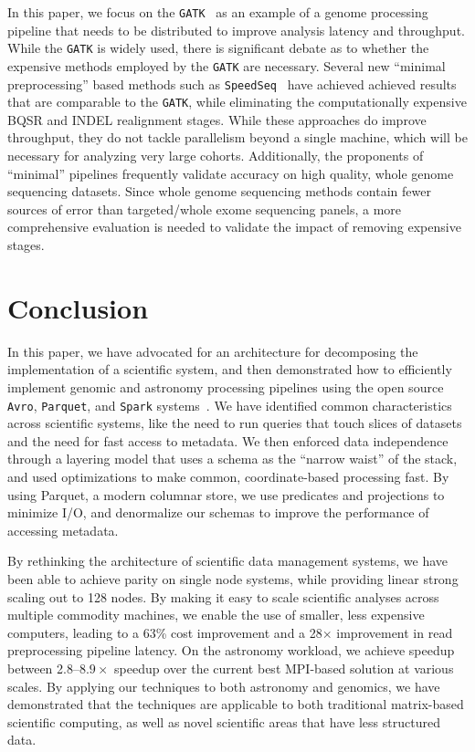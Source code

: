 \documentclass{sig-alternate}
\begin{document}
In this paper, we focus on the \texttt{GATK}~\cite{depristo11} as an example of a genome processing pipeline that
needs to be distributed to improve analysis latency and throughput. While the \texttt{GATK} is widely used,
there is significant debate as to whether the expensive methods employed by the \texttt{GATK} are necessary. Several
new ``minimal preprocessing'' based methods such as \texttt{SpeedSeq}~\cite{chiang14} have achieved achieved
results that are comparable to the \texttt{GATK}, while eliminating the computationally expensive BQSR and INDEL
realignment stages. While these approaches do improve throughput, they do not tackle parallelism beyond a single
machine, which will be necessary for analyzing very large cohorts. Additionally, the proponents of ``minimal'' pipelines
frequently validate accuracy on high quality, whole genome sequencing datasets. Since whole genome sequencing
methods contain fewer sources of error than targeted/whole exome sequencing panels, a more comprehensive
evaluation is needed to validate the impact of removing expensive stages.

\section{Conclusion}
\label{sec:conclusion}

In this paper, we have advocated for an architecture for decomposing the implementation of a scientific system, and
then demonstrated how to efficiently implement genomic and astronomy processing pipelines using the open source
\texttt{Avro}, \texttt{Parquet}, and \texttt{Spark} systems~\cite{avro, parquet, zaharia10}. We have identified common
characteristics across scientific systems, like the need to run queries that touch slices of datasets and the need
for fast access to metadata. We then enforced data independence through a layering model that uses a schema
as the ``narrow waist'' of the stack, and used optimizations to make common, coordinate-based processing
fast. By using Parquet, a modern columnar store, we use predicates and projections to minimize I/O, and
denormalize our schemas to improve the performance of accessing metadata.

By rethinking the architecture of scientific data management systems, we have been able to achieve parity on single
node systems, while providing linear strong scaling out to 128 nodes. By making it easy to scale scientific analyses
across multiple commodity machines, we enable the use of smaller, less expensive computers, leading to a 63\% cost
improvement and a 28$\times$ improvement in read preprocessing pipeline latency. On the astronomy workload, we
achieve speedup between 2.8--$8.9\times$ speedup over the current
best MPI-based solution at various scales. By applying our techniques to both astronomy and genomics, we have
demonstrated that the techniques are applicable to both traditional matrix-based scientific computing, as well as novel
scientific areas that have less structured data.
\end{document}
